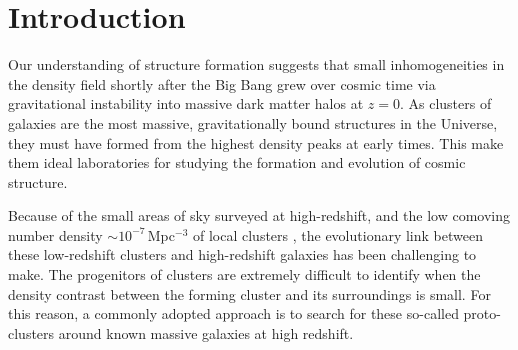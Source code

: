 \documentclass[iop, revtex4]{emulateapj}
\begin{document}

\section{Introduction}
\label{sec:intro}

Our understanding of structure formation suggests that
small inhomogeneities in the density field shortly after the Big
Bang grew over cosmic time via gravitational instability
\citep[e.g.][]{Dodelson03, Padmanabhan06, Schneider15} into
massive dark matter halos at $z=0$. As clusters of galaxies are the
most massive, gravitationally bound structures in the Universe, they
must have formed from the highest density peaks at early times.
This make them
ideal laboratories for studying the formation and evolution of cosmic structure.


Because of the small areas of sky surveyed at high-redshift, and the
low comoving number density $\sim10^{-7}$\,Mpc$^{-3}$ of local
clusters \citep{Gioia01, Vikhlinin09}, the evolutionary link between
these low-redshift clusters and high-redshift galaxies has been
challenging to make. The progenitors of clusters are extremely
difficult to identify when the density contrast between the forming
cluster and its surroundings is small. For this
reason, a commonly adopted approach is to search for these so-called
proto-clusters around known massive galaxies at high redshift.
\end{document}
